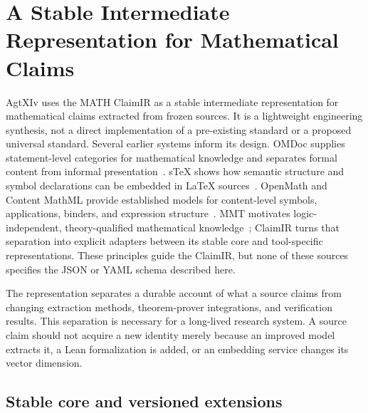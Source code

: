\section{A Stable Intermediate Representation for Mathematical Claims}\label{sec:math-claim-ir}


AgtXIv uses the MATH ClaimIR as a stable intermediate representation for mathematical claims extracted from frozen sources. It is a lightweight engineering synthesis, not a direct implementation of a pre-existing standard or a proposed universal standard. Several earlier systems inform its design. OMDoc supplies statement-level categories for mathematical knowledge and separates formal content from informal presentation~\cite{kohlhase2006omdoc}. sTeX shows how semantic structure and symbol declarations can be embedded in \LaTeX{} sources~\cite{kohlhase2008stex}. OpenMath and Content MathML provide established models for content-level symbols, applications, binders, and expression structure~\cite{openmath2019standard,w3c2014mathml}. MMT motivates logic-independent, theory-qualified mathematical knowledge~\cite{rabe2013mmt}; ClaimIR turns that separation into explicit adapters between its stable core and tool-specific representations. These principles guide the ClaimIR, but none of these sources specifies the JSON or YAML schema described here.

The representation separates a durable account of what a source claims from changing extraction methods, theorem-prover integrations, and verification results. This separation is necessary for a long-lived research system. A source claim should not acquire a new identity merely because an improved model extracts it, a Lean formalization is added, or an embedding service changes its vector dimension.

\subsection{Stable core and versioned extensions}

